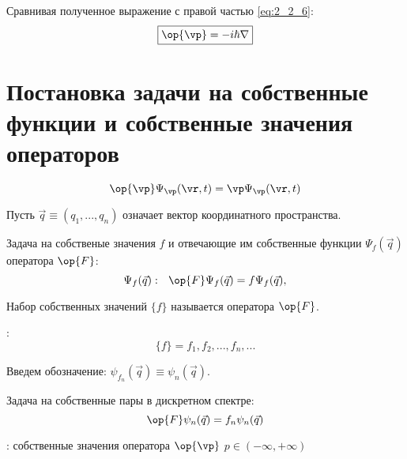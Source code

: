 Сравнивая полученное выражение с правой частью \eqref{eq:2_2_6}:
\begin{equation}
\label{eq:2_2_7}
\boxed{ \op{\vp} = -i\hbar\nabla }
\end{equation}

\section{Постановка задачи на собственные функции и собственные значения операторов}

\begin{equation}
\label{eq:2_3_1}
\op{\vp} \Psi_\vp(\vr,t) = \vp \Psi_\vp(\vr,t)
\end{equation}

Пусть $\vec{q}\equiv(q_1,...,q_n)$ означает вектор координатного пространства.

Задача на собственые значения $f$ и отвечающие им собственные функции $\Psi_f(\vec{q})$ оператора $\op{F}$: 
\begin{equation}
\label{eq:2_3_2}
\Psi_f(\vec{q}):~~ \op{F}\Psi_f(\vec{q}) = f \Psi_f(\vec{q}), 
\end{equation}

\begin{defn}
Набор собственных значений $\{f\}$ называется  оператора $\op{F}$.
\end{defn}

:
$$\{f\} = f_1,f_2,...,f_n,... $$

Введем обозначение: $\psi_{f_n}(\vec{q}) \equiv \psi_n(\vec{q})$.

Задача на собственные пары в дискретном спектре:
\begin{equation}
\label{eq:2_3_3}
\op{F} \psi_n(\vec{q}) = f_n \psi_n(\vec{q})
\end{equation}

: собственные значения оператора $\op{\vp}$ $p \in (-\infty, +\infty)$
